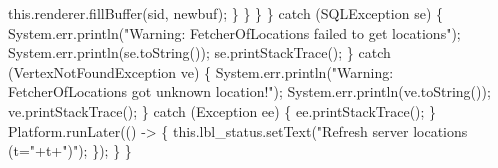             this.renderer.fillBuffer(sid, newbuf);
          \}
        \}
      \}
    \} catch (SQLException se) \{
      System.err.println("Warning: FetcherOfLocations failed to get locations");
      System.err.println(se.toString());
      se.printStackTrace();
    \} catch (VertexNotFoundException ve) \{
      System.err.println("Warning: FetcherOfLocations got unknown location!");
      System.err.println(ve.toString());
      ve.printStackTrace();
    \} catch (Exception ee) \{
      ee.printStackTrace();
    \}
    Platform.runLater(() -> \{
      this.lbl_status.setText("Refresh server locations (t="+t+")");
    \});
  \}
\}
\nwendcode{}\nwdocspar


